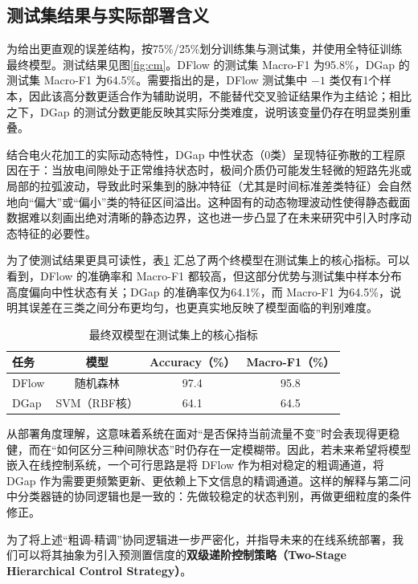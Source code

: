 \documentclass[UTF8,a4paper,12pt]{ctexart}
\begin{document}
\subsection{测试集结果与实际部署含义}

为给出更直观的误差结构，按75\%/25\%划分训练集与测试集，并使用全特征训练最终模型。测试结果见图\ref{fig:cm}。DFlow 的测试集 Macro-F1 为95.8\%，DGap 的测试集 Macro-F1 为64.5\%。需要指出的是，DFlow 测试集中 $-1$ 类仅有1个样本，因此该高分数更适合作为辅助说明，不能替代交叉验证结果作为主结论；相比之下，DGap 的测试分数更能反映其实际分类难度，说明该变量仍存在明显类别重叠。

结合电火花加工的实际动态特性，DGap 中性状态（0类）呈现特征弥散的工程原因在于：当放电间隙处于正常维持状态时，极间介质仍可能发生轻微的短路先兆或局部的拉弧波动，导致此时采集到的脉冲特征（尤其是时间标准差类特征）会自然地向“偏大”或“偏小”类的特征区间溢出。这种固有的动态物理波动性使得静态截面数据难以刻画出绝对清晰的静态边界，这也进一步凸显了在未来研究中引入时序动态特征的必要性。

为了使测试结果更具可读性，表\ref{tab:testbrief} 汇总了两个终模型在测试集上的核心指标。可以看到，DFlow 的准确率和 Macro-F1 都较高，但这部分优势与测试集中样本分布高度偏向中性状态有关；DGap 的准确率仅为64.1\%，而 Macro-F1 为64.5\%，说明其误差在三类之间分布更均匀，也更真实地反映了模型面临的判别难度。

\begin{table}[H]
\centering
\caption{最终双模型在测试集上的核心指标}
\label{tab:testbrief}
\begin{tabular}{lccc}
\toprule
任务 & 模型 & Accuracy（\%） & Macro-F1（\%） \\
\midrule
DFlow & 随机森林 & 97.4 & 95.8 \\
DGap & SVM（RBF核） & 64.1 & 64.5 \\
\bottomrule
\end{tabular}
\end{table}

从部署角度理解，这意味着系统在面对“是否保持当前流量不变”时会表现得更稳健，而在“如何区分三种间隙状态”时仍存在一定模糊带。因此，若未来希望将模型嵌入在线控制系统，一个可行思路是将 DFlow 作为相对稳定的粗调通道，将 DGap 作为需要更频繁更新、更依赖上下文信息的精调通道。这样的解释与第二问中分类器链的协同逻辑也是一致的：先做较稳定的状态判别，再做更细粒度的条件修正。

为了将上述“粗调-精调”协同逻辑进一步严密化，并指导未来的在线系统部署，我们可以将其抽象为引入预测置信度的\textbf{双级递阶控制策略（Two-Stage Hierarchical Control Strategy）}。
\end{document}
